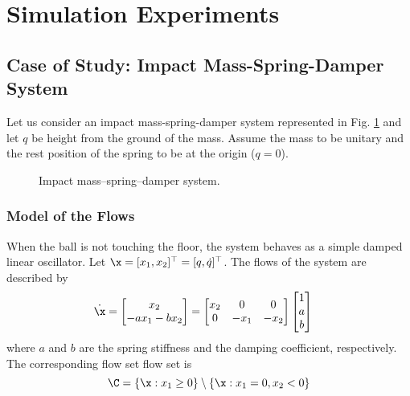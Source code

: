 \clearpage
\section{Simulation Experiments}\label{Experiments}
\subsection{Case of Study: Impact Mass-Spring-Damper System}
Let us consider an impact mass-spring-damper system represented in Fig. \ref{fig:msd} and let $q$ be height from the ground of the mass. Assume the mass to be unitary and the rest position of the spring to be at the origin ($q=0$). 
%
\begin{figure}[!b]
	\centering
	
    \caption{Impact mass--spring--damper system.}
    \label{fig:msd}
\end{figure}
%
\subsubsection{Model of the Flows}
%
When the ball is not touching the floor, the system behaves as a simple damped linear oscillator. Let $\x = [x_1,x_2]^\top = [q,\dot{q}]^\top$. The flows of the system are described by 
\begin{align}
	\dot{\x}&=\begin{bmatrix}x_2\\-ax_1-bx_2\end{bmatrix}
	=\begin{bmatrix}x_2&0&0\\0&-x_1&-x_2\end{bmatrix}\begin{bmatrix}1\\a\\b\end{bmatrix}
\end{align}
%
{where $a$ and $b$ are the spring stiffness and the damping coefficient, respectively}. The corresponding flow set flow set is
%
\begin{equation}
    \C = \{\x:x_1\geq0\}\setminus\{\x:x_1=0,x_2<0\}
\end{equation}
%
